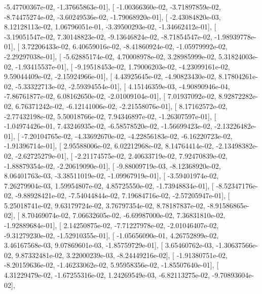 \documentclass{article}
\begin{document}
         -5.47700367e-02,  -1.37665863e-01],
       [ -1.00366360e-02,  -3.71897859e-02,  -8.74475274e-02,
         -3.60249536e-02,  -1.79068920e-01],
       [ -2.43084820e-03,   8.12128113e-02,   1.06796051e-01,
         -3.39500293e-02,  -1.34662412e-01],
       [ -3.19051547e-02,   7.30148823e-02,  -9.13646824e-02,
         -8.71854547e-02,  -1.98939778e-01],
       [  3.72206433e-02,   6.40659016e-02,  -8.41860924e-02,
         -1.05979992e-02,  -2.29297038e-01],
       [ -5.62885174e-02,   4.70008978e-02,   3.28985999e-02,
          5.31824003e-02,  -1.93415537e-01],
       [ -9.19518453e-02,   1.79006203e-02,  -4.23099161e-02,
          9.59044409e-02,  -2.15924966e-01],
       [  4.43925645e-02,  -4.90823430e-02,   8.17804261e-02,
         -5.33322713e-02,  -2.59394554e-01],
       [  4.15146359e-03,  -4.90890946e-04,  -7.86761877e-02,
          6.08162650e-02,  -2.01009104e-01],
       [  7.01937092e-02,   8.92872282e-02,   6.76371242e-02,
         -6.12141006e-02,  -2.21558076e-01],
       [  8.17162572e-02,  -2.77432198e-02,   5.50018766e-02,
          7.94346897e-02,  -1.26307597e-01],
       [ -1.04974426e-01,   7.43246935e-02,  -6.58578520e-02,
         -1.56699423e-02,  -2.13226482e-01],
       [ -7.20104765e-02,  -4.33692670e-02,  -4.22856183e-02,
         -6.16220723e-02,  -1.91396714e-01],
       [  2.95588006e-02,   6.02212968e-02,   8.14764414e-02,
         -2.13498382e-02,  -2.62725279e-01],
       [ -2.21174575e-02,   2.40633719e-02,   7.92470839e-02,
         -1.88879354e-02,  -2.20619090e-01],
       [ -9.88009719e-03,  -8.12368920e-02,   8.06401763e-03,
         -3.38511019e-02,  -1.09967919e-01],
       [ -3.59401974e-02,   7.26279904e-03,   1.59954807e-02,
          4.85725550e-02,  -1.73948834e-01],
       [ -8.52347176e-02,  -9.88928421e-02,  -7.54044844e-02,
          7.19684716e-02,  -2.57205947e-01],
       [  5.25018741e-02,   9.63179724e-02,   3.76797354e-02,
          8.78187837e-02,  -8.91586865e-02],
       [  8.70469074e-02,   7.06632605e-02,  -6.69987000e-02,
          7.36831810e-02,  -1.92889684e-01],
       [  2.14250875e-02,  -7.71227978e-02,  -2.01046407e-02,
         -9.31279230e-02,  -1.52910355e-01],
       [ -1.05656090e-01,   4.26752899e-02,   3.46167568e-03,
          9.07869601e-03,  -1.85759729e-01],
       [  3.65460762e-03,  -1.30637566e-02,   9.87332481e-02,
          3.22000239e-03,  -8.24449216e-02],
       [ -1.91380751e-02,  -8.20159636e-02,  -1.46233062e-02,
          5.95958356e-02,  -1.85507640e-01],
       [  4.31229479e-02,  -1.67255316e-02,   1.24269549e-03,
         -6.82113275e-02,  -9.70893604e-02],
\end{document}
